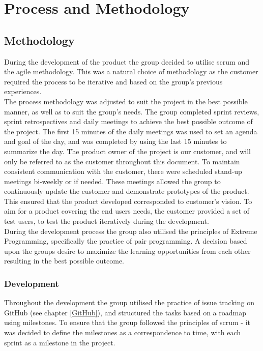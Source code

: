 
\chapter{Process and Methodology}

\section{Methodology}
\label{methodology}
During the development of the product the group decided to utilise scrum and the agile methodology. This was a natural choice of methodology as the customer required the process to be iterative and based on the group's previous experiences.\\ 

\noindent The process methodology was adjusted to suit the project in the best possible manner, as well as to suit the group's needs. The group completed sprint reviews, sprint retrospectives and daily meetings to achieve the best possible outcome of the project. The first 15 minutes of the daily meetings was used to set an agenda and goal of the day, and was completed by using the last 15 minutes to summarize the day. The product owner of the project is our customer, and will only be referred to as the customer throughout this document. To maintain consistent communication with the customer, there were scheduled stand-up meetings bi-weekly or if needed. These meetings allowed the group to continuously update the customer and demonstrate prototypes of the product. This ensured that the product developed corresponded to customer's vision. To aim for a product covering the end users needs, the customer provided a set of test users, to test the product iteratively during the development. \\

\noindent During the development process the group also utilised the principles of Extreme Programming, specifically the practice of pair programming. A decision based upon the groups desire to maximize the learning opportunities from each other resulting in the best possible outcome. 

\subsection{Development}
Throughout the development the group utilised the practice of issue tracking on GitHub (see chapter  \ref{GitHub}), and structured the tasks based on a roadmap using milestones. To ensure that the group followed the principles of scrum - it was decided to define the milestones as a correspondence to time, with each sprint as a milestone in the project. \\

